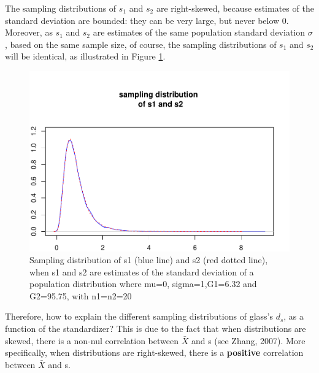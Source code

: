 \documentclass[
  man,floatsintext]{apa6}
\begin{document}
The sampling distributions of \(s_1\) and \(s_2\) are right-skewed, because estimates of the standard deviation are bounded: they can be very large, but never below 0. Moreover, as \(s_1\) and \(s_2\) are estimates of the same population standard deviation \(\sigma\), based on the same sample size, of course, the sampling distributions of \(s_1\) and \(s_2\) will be identical, as illustrated in Figure \ref{fig:sampldist2}.

\begin{figure}
\centering
\includegraphics{Mathematical-study-of-Glass-s-d_files/figure-latex/sampldist2-1.pdf}
\caption{\label{fig:sampldist2}Sampling distribution of s1 (blue line) and s2 (red dotted line), when s1 and s2 are estimates of the standard deviation of a population distribution where mu=0, sigma=1,G1=6.32 and G2=95.75, with n1=n2=20}
\end{figure}

Therefore, how to explain the different sampling distributions of glass's \(d_s\), as a function of the standardizer? This is due to the fact that when distributions are skewed, there is a non-nul correlation between \(\bar{X}\) and s (see Zhang, 2007). More specifically, when distributions are right-skewed, there is a \textbf{positive} correlation between \(\bar{X}\) and s.
\end{document}
